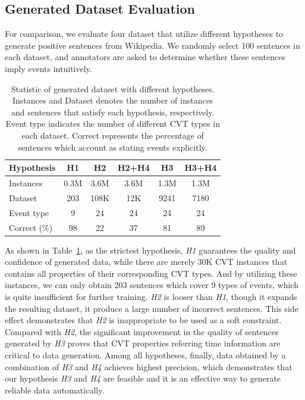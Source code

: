 \documentclass{article}
\begin{document}
\subsection{Generated Dataset Evaluation}\label{sec:evalhypo}
For comparison, we evaluate four dataset that utilize different hypotheses to generate positive sentences from Wikipedia. We randomly select 100 sentences in each dataset, and annotators are asked to determine whether these sentences imply events intuitively. 

\begin{table}[h]
\centering
\begin{tabular}{|l|c|c|c|c|c|} \hline
	Hypothesis & H1 & H2 & H2+H4 & H3 & H3+H4 \\ \hline
	Instances & 0.3M & 3.6M & 3.6M & 1.3M & 1.3M \\ \hline
	Dataset & 203 & 108K & 12K & 9241 & 7180 \\ \hline
	Event type & 9 & 24 & 24 & 24 & 24 \\ \hline
	Correct (\%) & 98 & 22 & 37 & 81 & 89 \\ \hline
\end{tabular}
\caption{Statistic of generated dataset with different hypotheses. Instances and Dataset denotes the number of instances and sentences that satisfy each hypothesis, respectively. Event type indicates the number of different CVT types in each dataset. Correct represents the percentage of sentences which account as stating events explicitly. \label{tab:3}}
\end{table}

As shown in Table~\ref{tab:3}, as the strictest hypothesis, \emph{H1} guarantees the quality and confidence of generated data, while there are merely 30K CVT instances that contains all properties of their corresponding CVT types. And by utilizing these instances, we can only obtain 203 sentences which cover 9 types of events, which is quite insufficient for further training. \emph{H2} is looser than \emph{H1}, though it expands the resulting dataset, it produce a large number of incorrect sentences. This side effect  demonstrates that \emph{H2} is inappropriate to be used as a soft constraint. Compared with \emph{H2}, the significant improvement in the quality of sentences generated by \emph{H3} proves that CVT properties referring time information are critical to data generation. Among all hypotheses, finally, data obtained by a combination of \emph{H3} and \emph{H4} achieves highest precision, which demonstrates that our hypothesis \emph{H3} and \emph{H4} are feasible and it is an effective way to generate reliable data automatically.
\end{document}
